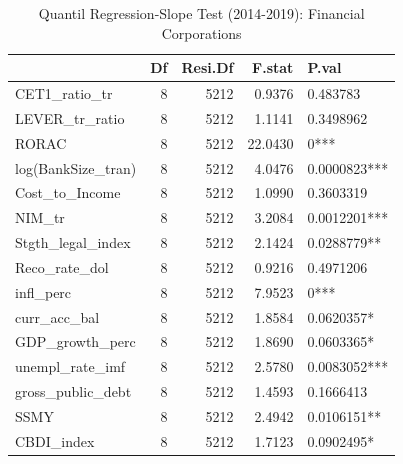 \begin{table}[ht]
\centering
\caption{Quantil Regression-Slope Test (2014-2019): Financial Corporations} 
\label{slope.fi}
\begingroup\small
\begin{tabular}{lrrrl}
  \toprule
 & Df & Resi.Df & F.stat & P.val \\ 
  \midrule
CET1\_ratio\_tr & 8 & 5212 & 0.9376 & 0.483783 \\ 
  LEVER\_tr\_ratio & 8 & 5212 & 1.1141 & 0.3498962 \\ 
  RORAC & 8 & 5212 & 22.0430 & 0*** \\ 
  log(BankSize\_tran) & 8 & 5212 & 4.0476 & 0.0000823*** \\ 
  Cost\_to\_Income & 8 & 5212 & 1.0990 & 0.3603319 \\ 
  NIM\_tr & 8 & 5212 & 3.2084 & 0.0012201*** \\ 
  Stgth\_legal\_index & 8 & 5212 & 2.1424 & 0.0288779** \\ 
  Reco\_rate\_dol & 8 & 5212 & 0.9216 & 0.4971206 \\ 
  infl\_perc & 8 & 5212 & 7.9523 & 0*** \\ 
  curr\_acc\_bal & 8 & 5212 & 1.8584 & 0.0620357* \\ 
  GDP\_growth\_perc & 8 & 5212 & 1.8690 & 0.0603365* \\ 
  unempl\_rate\_imf & 8 & 5212 & 2.5780 & 0.0083052*** \\ 
  gross\_public\_debt & 8 & 5212 & 1.4593 & 0.1666413 \\ 
  SSMY & 8 & 5212 & 2.4942 & 0.0106151** \\ 
  CBDI\_index & 8 & 5212 & 1.7123 & 0.0902495* \\ 
   \bottomrule
\end{tabular}
\endgroup
\end{table}
